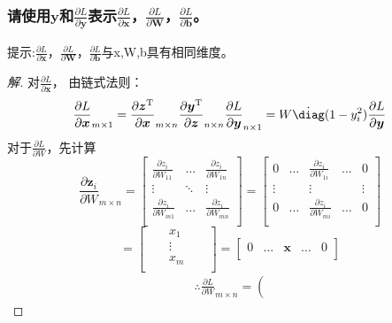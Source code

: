 \documentclass[a4paper]{article}
\begin{document}
\subsubsection{请使用$\mathbf{y}$和$\frac{\partial L}{\partial \mathbf{y}}$表示$\frac{\partial L}{\partial \mathbf{x}}$，$\frac{\partial L}{\partial \mathbf{W}}$，$\frac{\partial L}{\partial \mathbf{b}}$。}
提示:$\frac{\partial L}{\partial \mathbf{x}}$，$\frac{\partial L}{\partial \mathbf{W}}$，$\frac{\partial L}{\partial \mathbf{b}}$与x,W,b具有相同维度。
\begin{proof}[解]
    对$\frac{\partial L}{\partial \boldsymbol x}$， 由链式法则：
    \[\frac{\partial L}{\partial \boldsymbol x}_{m \times 1} = \frac{\partial \boldsymbol z^{\mathrm T}}{\partial \boldsymbol x}_{m \times n} \frac{\partial \boldsymbol y^{\mathrm{T}}}{\partial \boldsymbol z}_{n \times n} \frac{\partial L}{\partial \boldsymbol y}_{n \times 1} = W \dot \diag (1 - y_i^2)\frac{\partial L}{\partial \boldsymbol y}\]
    对于$\frac{\partial L}{\partial W}$，先计算
    \[\frac{\partial \boldsymbol z_i}{\partial W}_{m \times n} = 
    \begin{bmatrix}
        \frac{\partial z_i}{\partial W_{11}} & \dots & \frac{\partial z_i}{\partial W_{1n}} \\
        \vdots & \ddots & \vdots \\
        \frac{\partial z_i}{\partial W_{m1}} & \dots & \frac{\partial z_i}{\partial W_{mn}} \\
    \end{bmatrix} = \begin{bmatrix}
        0 & \dots & \frac{\partial z_i}{\partial W_{1i}} & \dots & 0 \\
        \vdots & & \vdots & & \vdots \\
        0 & \dots & \frac{\partial z_i}{\partial W_{mi}} & \dots & 0 \\
    \end{bmatrix} \]
    \[ = \begin{bmatrix}
        & & x_1 & & \\
        & & \vdots & & \\
        & & x_m & & \\
    \end{bmatrix} = \begin{bmatrix}
        0 & \dots & \boldsymbol x & \dots & 0 \\
    \end{bmatrix}\]
    \begin{multline*}
        \therefore \frac{\partial L}{\partial W}_{m \times n} = \left(

\end{multline*}
\end{proof}
\end{document}
